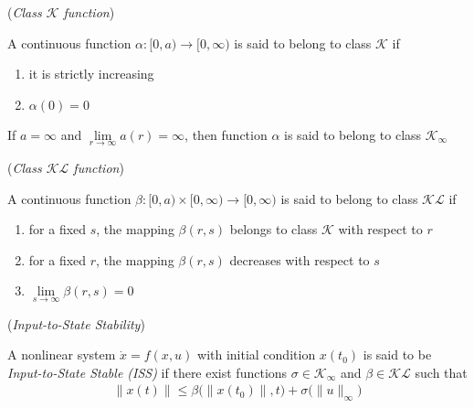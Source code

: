 \begin{bw_box}
\begin{definition}\cite{khalil_nonlinear_systems} (\textit{Class $\mathcal{K}$ function})
\label{def:k_class}

  A continuous function $\alpha : [0, a) \to [0, \infty)$
  is said to belong to class $\mathcal{K}$ if
  \begin{enumerate}
    \item it is strictly increasing
    \item $\alpha (0) = 0$
  \end{enumerate}
  If $a = \infty$ and $\lim\limits_{r \to \infty} a(r) = \infty$, then function
  $\alpha$ is said to belong to class $\mathcal{K}_{\infty}$
\end{definition}
\end{bw_box}

\begin{bw_box}
\begin{definition}\cite{khalil_nonlinear_systems} (\textit{Class $\mathcal{KL}$ function})
\label{def:kl_class}

  A continuous function $\beta : [0, a) \times [0, \infty) \to [0, \infty)$
  is said to belong to class $\mathcal{KL}$ if
  \begin{enumerate}
    \item for a fixed $s$, the mapping $\beta(r,s)$ belongs to class $\mathcal{K}$ with respect to $r$
    \item for a fixed $r$, the mapping $\beta(r,s)$ decreases with respect to $s$
    \item $\lim\limits_{s \to \infty} \beta(r,s) = 0$
  \end{enumerate}
\end{definition}
\end{bw_box}


\begin{bw_box}
\begin{definition}\cite{Sontag2008} (\textit{Input-to-State Stability})
\label{def:ISS}

  A nonlinear system $\dot{x} = f(x,u)$ with initial condition $x(t_0)$ is said
  to be \textit{Input-to-State Stable (ISS)} if there exist functions
  $\sigma \in \mathcal{K}_{\infty}$ and $\beta \in \mathcal{KL}$ such that
  \begin{align}
    \|x(t)\| \leq \beta\big(\|x(t_0)\|,t\big) + \sigma\big(\|u\|_{\infty}\big)
  \end{align}
\end{definition}
\end{bw_box}

